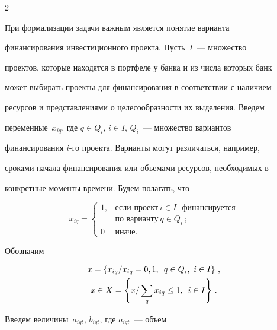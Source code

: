 \begin{multicols}{2}
     


     При формализации задачи важным является понятие варианта 


финансирования инвестиционного проекта. Пусть~$I$~--- множество 


проектов, которые находятся в портфеле у банка и из числа которых банк 


может выбирать проекты для финансирования в соответствии с наличием 


ресурсов и представлениями о целесообразности их выделения. Введем 


переменные~$x_{iq}$, где $q\in Q_i$, $i\in I$, $Q_i$~--- множество вариантов 


финансирования $i$-го  проекта. Варианты могут различаться, например, 


сроками начала финансирования или объемами ресурсов, необходимых в 


конкретные моменты времени. Будем полагать, что


     $$


     x_{iq}= 


     \begin{cases}


     1, & \mbox{если проект}\ i\in I \mbox{~~финансируется}\\


     & \mbox{по варианту}\ q\in  Q_i\,;\\


     0 & \mbox{иначе.}


     \end{cases}


     $$


     





Обозначим


\begin{gather*}


x=\left \{ x_{iq}/x_{iq} =0, 1, \enskip q\in Q_i, \ i\in I\right \}\,,\\


x\in X=\left \{ x/ \sum\limits_q x_{iq}\leq 1, \enskip i\in I\right \}\,.


\end{gather*}





     


     Введем величины~$a_{iqt}$, $b_{iqt}$, где $a_{iqt}$~--- объем 



\end{multicols}
